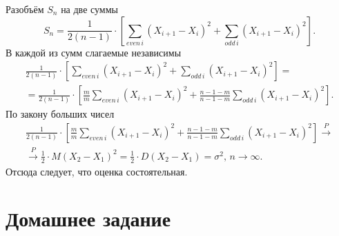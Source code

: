 Разобъём $S_n$ на две суммы
$$S_n =
  \frac{1}{2 \left( n - 1 \right) } \cdot
  \left[
    \sum \limits_{even \, i} \left( X_{i + 1} - X_i \right)^2 +
    \sum \limits_{odd \, i} \left( X_{i + 1} - X_i \right)^2
  \right].$$
В каждой из сумм слагаемые независимы
\begin{equation*}
  \begin{split}
    \frac{1}{2 \left( n - 1 \right) } \cdot
    \left[
      \sum \limits_{even \, i} \left( X_{i + 1} - X_i \right)^2 +
      \sum \limits_{odd \, i} \left( X_{i + 1} - X_i \right)^2
    \right] = \\
    = \frac{1}{2 \left( n - 1 \right) } \cdot
    \left[
      \frac{m}{m} \sum \limits_{even \, i} \left( X_{i + 1} - X_i \right)^2 +
      \frac{n - 1 - m}{n - 1 - m} \sum \limits_{odd \, i} \left( X_{i + 1} - X_i \right)^2
    \right].
  \end{split}
\end{equation*}
По закону больших чисел
\begin{equation*}
  \begin{split}
    \frac{1}{2 \left( n - 1 \right) } \cdot
    \left[
      \frac{m}{m} \sum \limits_{even \, i} \left( X_{i + 1} - X_i \right)^2 +
      \frac{n - 1 - m}{n - 1 - m} \sum \limits_{odd \, i} \left( X_{i + 1} - X_i \right)^2
    \right] \overset{P}{ \rightarrow } \\
    \overset{P}{ \rightarrow } \frac{1}{2} \cdot M \left( X_2 - X_1 \right)^2 =
    \frac{1}{2} \cdot D \left( X_2 - X_1 \right) =
    \sigma^2, \,
    n \to \infty.
  \end{split}
\end{equation*}
Отсюда следует, что оценка состоятельная.

\section*{Домашнее задание}
